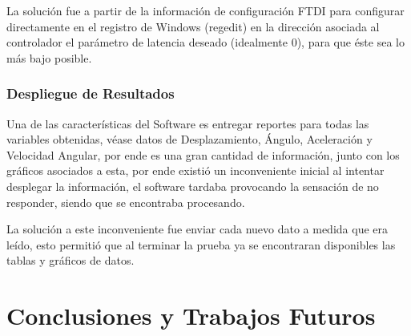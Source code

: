 \documentclass[12pt,a4paper]{article}
\begin{document}
La solución fue a partir de la información de configuración FTDI\cite{FTDI} para configurar directamente  en el registro de Windows (regedit) en la dirección asociada al controlador el parámetro de latencia deseado (idealmente 0), para que éste sea lo más bajo posible.

\subsubsection{Despliegue de Resultados}
Una de las características del Software es entregar reportes para todas las variables obtenidas, véase datos de Desplazamiento, Ángulo, Aceleración y Velocidad Angular, por ende es una gran cantidad de información, junto con los gráficos asociados a esta, por ende existió un inconveniente inicial al intentar desplegar la información, el software tardaba provocando la sensación de no responder, siendo que se encontraba procesando.

La solución a este inconveniente fue enviar cada nuevo dato a medida que era leído, esto permitió que al terminar la prueba ya se encontraran disponibles las tablas y gráficos de datos.

\section{Conclusiones y Trabajos Futuros}
\end{document}
